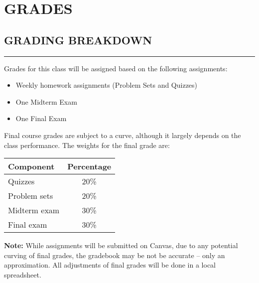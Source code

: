 \section*{GRADES}

\subsection*{GRADING BREAKDOWN}
\vspace*{-0.5cm}
\rule{\textwidth}{2pt}

Grades for this class will be assigned based on the following assignments:
\begin{itemize}
    \item Weekly homework assignments (Problem Sets and Quizzes)
    \item One Midterm Exam
    \item One Final Exam
\end{itemize}
Final course grades are subject to a curve, although it largely depends on the class performance. 
The weights for the final grade are:

\begin{center}
\begin{tabular}{lc}
\toprule
\textbf{Component} & \textbf{Percentage} \\
\midrule
Quizzes       & 20\% \\
Problem sets  & 20\% \\
Midterm exam  & 30\% \\
Final exam    & 30\% \\
\bottomrule
\end{tabular}
\end{center}

\textbf{Note:} 
While assignments will be submitted on Canvas, due to any potential curving of final grades, the gradebook may be not be accurate -- only an approximation. 
All adjustments of final grades will be done in a local spreadsheet. 